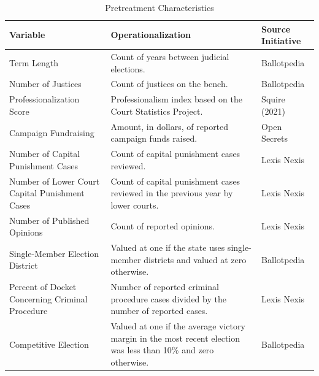 \begin{table}[htbp]
\captionsetup{justification=raggedright, singlelinecheck=false, skip=3pt} %
\caption{Pretreatment Characteristics}
\label{tab:pretreatment}
\centering
\renewcommand{\arraystretch}{0.95} %


\begin{tabularx}{\textwidth}{@{} V H >{\raggedright\arraybackslash}p{3.6cm} @{}}
\toprule
\textbf{Variable} & \textbf{Operationalization} & \textbf{Source Initiative} \\
\midrule
Term Length &
Count of years between judicial elections. &
Ballotpedia \\

Number of Justices &
Count of justices on the bench. &
Ballotpedia \\

Professionalization Score &
Professionalism index based on the Court Statistics Project. &
Squire (2021) \\

Campaign Fundraising &
Amount, in dollars, of reported campaign funds raised. &
Open Secrets \\

Number of Capital Punishment Cases &
Count of capital punishment cases reviewed. &
Lexis Nexis \\

Number of Lower Court Capital Punishment Cases &
Count of capital punishment cases reviewed in the previous year by lower courts. &
Lexis Nexis \\

Number of Published Opinions &
Count of reported opinions. &
Lexis Nexis \\

Single-Member Election District &
Valued at one if the state uses single-member districts and valued at zero otherwise. &
Ballotpedia \\

Percent of Docket Concerning Criminal Procedure &
Number of reported criminal procedure cases divided by the number of reported cases. &
Lexis Nexis \\

Competitive Election &
Valued at one if the average victory margin in the most recent election was less than 10\% and zero otherwise. &
Ballotpedia \\


\end{tabularx}
\end{table}
